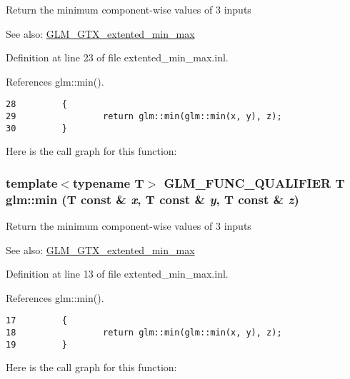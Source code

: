 Return the minimum component-wise values of 3 inputs \begin{Desc}
\item[See also:]\hyperlink{group__gtx__extented__min__max}{GLM\_\-GTX\_\-extented\_\-min\_\-max} \end{Desc}


Definition at line 23 of file extented\_\-min\_\-max.inl.

References glm::min().

\begin{Code}\begin{verbatim}28         {
29                 return glm::min(glm::min(x, y), z);
30         }
\end{verbatim}
\end{Code}




Here is the call graph for this function:\hypertarget{group__gtx__extented__min__max_gff0ad3009c15ec132717c7150dd96803}{
\subsubsection[min]{\setlength{\rightskip}{0pt plus 5cm}template$<$typename T$>$ GLM\_\-FUNC\_\-QUALIFIER T glm::min (T const \& {\em x}, \/  T const \& {\em y}, \/  T const \& {\em z})}}
\label{group__gtx__extented__min__max_gff0ad3009c15ec132717c7150dd96803}


Return the minimum component-wise values of 3 inputs \begin{Desc}
\item[See also:]\hyperlink{group__gtx__extented__min__max}{GLM\_\-GTX\_\-extented\_\-min\_\-max} \end{Desc}


Definition at line 13 of file extented\_\-min\_\-max.inl.

References glm::min().

\begin{Code}\begin{verbatim}17         {
18                 return glm::min(glm::min(x, y), z);
19         }
\end{verbatim}
\end{Code}




Here is the call graph for this function: